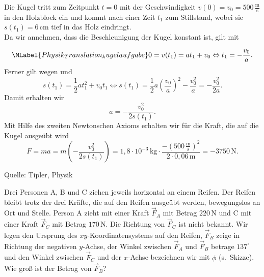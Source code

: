 \begin{MExercises}
\begin{MExercise}
               \begin{MSolution}
               Die Kugel tritt zum Zeitpunkt $t=0$ mit der Geschwindigkeit $v(0)=v_0=500\,\frac{\text{m}}{\text{s}}$ in den Holzblock ein und kommt nach einer Zeit $t_1$ zum Stillstand, wobei sie $s(t_1)=6\,\text{cm}$ tief in das Holz eindringt. \\
               
               Da wir annehmen, dass die Beschleunigung der Kugel konstant ist, gilt mit 
               
               \begin{equation}\MLabel{Physik_Translation_kugelaufgabe}
               0=v(t_1)=a t_1+v_0\Leftrightarrow t_1=-\frac{v_0}{a}.
               \end{equation} 
               Ferner gilt wegen  und 
               $$
               s(t_1)=\frac{1}{2}at_1^2+v_0t_1\Leftrightarrow s(t_1)=\frac{1}{2}a\left(\frac{v_0}{a}\right)^2-\frac{v_0^2}{a}=-\frac{v_0^2}{2a}.
               $$ Damit erhalten wir
               $$
               a=-\frac{v_0^2}{2s(t_1)}.
               $$ Mit Hilfe des zweiten Newtonschen Axioms erhalten wir f\"ur die Kraft, die auf die Kugel ausge\"ubt wird
               $$
               F=ma=m\left(-\frac{v_0^2}{2s(t_1)}\right)={1,8}\cdot 10^{-3}\,\text{kg}\cdot\frac{-\left(500\,\frac{\text{m}}{\text{s}}\right)^2}{2\cdot {0,06}\,\text{m}}=-3750\, \text{N}.
               $$
               \end{MSolution}
               
               Quelle: Tipler, Physik
               \end{MExercise}
               
               \begin{MExercise}
               Drei Personen A, B und C ziehen jeweils horizontal an einem Reifen. Der Reifen bleibt trotz der drei Kr\"afte, die auf den Reifen ausge\"ubt werden, bewegungslos an Ort und Stelle. Person A zieht mit einer Kraft $\vec{F}_A$ mit Betrag $220\,\text{N}$ und C mit einer Kraft $\vec{F}_C$ mit Betrag $170\,\text{N}$. Die Richtung von  $\vec{F}_C$ ist nicht bekannt. Wir legen den Ursprung des $xy$-Koordinatensystems auf den Reifen, $\vec{F}_B$ zeige in Richtung der negativen $y$-Achse, der Winkel zwischen $\vec{F}_A$ und $\vec{F}_B$ betrage $137^{\circ}$ und den Winkel zwischen $\vec{F}_C$ und der $x$-Achse bezeichnen wir mit $\phi$ (s.~Skizze). Wie gro{\ss} ist der Betrag von $\vec{F}_B$? 
               

\end{MExercise}
\end{MExercises}
